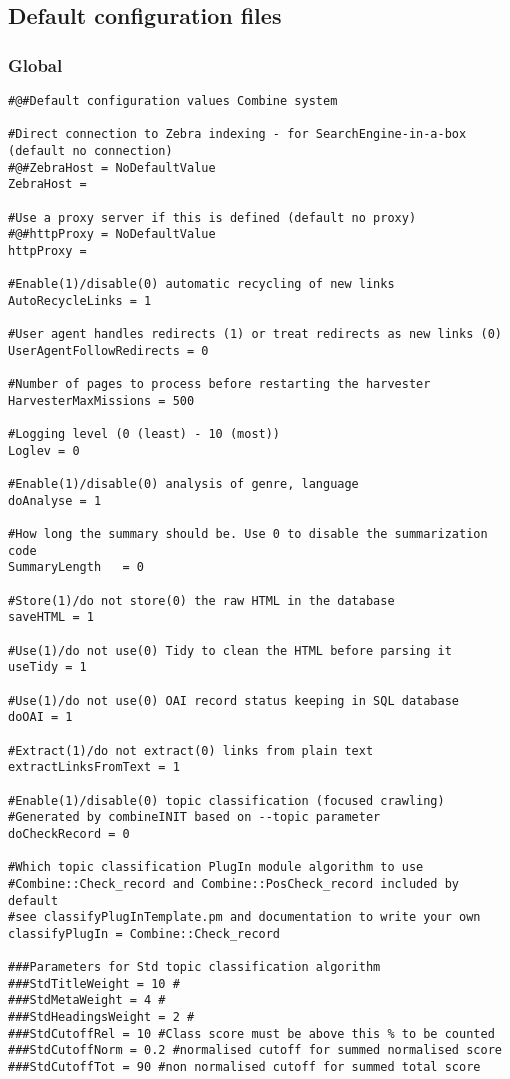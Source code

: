 \subsection{Default configuration files}

\label{conffiles}
\subsubsection{Global}

\begin{verbatim}
#@#Default configuration values Combine system

#Direct connection to Zebra indexing - for SearchEngine-in-a-box (default no connection)
#@#ZebraHost = NoDefaultValue
ZebraHost =

#Use a proxy server if this is defined (default no proxy)
#@#httpProxy = NoDefaultValue
httpProxy =

#Enable(1)/disable(0) automatic recycling of new links
AutoRecycleLinks = 1

#User agent handles redirects (1) or treat redirects as new links (0)
UserAgentFollowRedirects = 0

#Number of pages to process before restarting the harvester
HarvesterMaxMissions = 500

#Logging level (0 (least) - 10 (most))
Loglev = 0

#Enable(1)/disable(0) analysis of genre, language
doAnalyse = 1

#How long the summary should be. Use 0 to disable the summarization code
SummaryLength   = 0

#Store(1)/do not store(0) the raw HTML in the database
saveHTML = 1

#Use(1)/do not use(0) Tidy to clean the HTML before parsing it
useTidy = 1

#Use(1)/do not use(0) OAI record status keeping in SQL database
doOAI = 1

#Extract(1)/do not extract(0) links from plain text
extractLinksFromText = 1

#Enable(1)/disable(0) topic classification (focused crawling)
#Generated by combineINIT based on --topic parameter
doCheckRecord = 0

#Which topic classification PlugIn module algorithm to use
#Combine::Check_record and Combine::PosCheck_record included by default
#see classifyPlugInTemplate.pm and documentation to write your own
classifyPlugIn = Combine::Check_record

###Parameters for Std topic classification algorithm
###StdTitleWeight = 10 #
###StdMetaWeight = 4 #
###StdHeadingsWeight = 2 #
###StdCutoffRel = 10 #Class score must be above this % to be counted
###StdCutoffNorm = 0.2 #normalised cutoff for summed normalised score
###StdCutoffTot = 90 #non normalised cutoff for summed total score


\end{verbatim}
